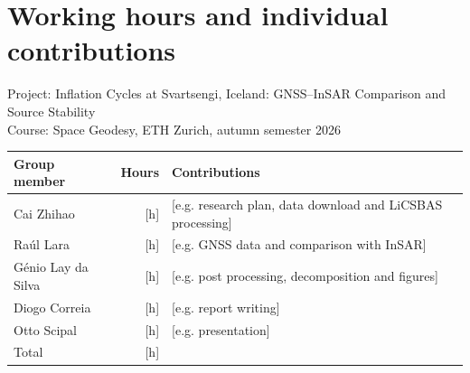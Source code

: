 \documentclass[11pt,a4paper]{article}
\begin{document}
\section*{Working hours and individual contributions}

\noindent Project: Inflation Cycles at Svartsengi, Iceland: GNSS--InSAR Comparison and Source Stability\\
Course: Space Geodesy, ETH Zurich, autumn semester 2026

\vspace{1em}
\noindent
\begin{tabularx}{\textwidth}{@{}lrX@{}}
  \toprule
  Group member & Hours & Contributions \\
  \midrule
  Cai Zhihao & [h] & [e.g. research plan, data download and LiCSBAS processing] \\
  Raúl Lara & [h] & [e.g. GNSS data and comparison with InSAR] \\
  Génio Lay da Silva & [h] & [e.g. post processing, decomposition and figures] \\
  Diogo Correia & [h] & [e.g. report writing] \\
  Otto Scipal & [h] & [e.g. presentation] \\
  \midrule
  Total & [h] & \\
  \bottomrule
\end{tabularx}
\end{document}

